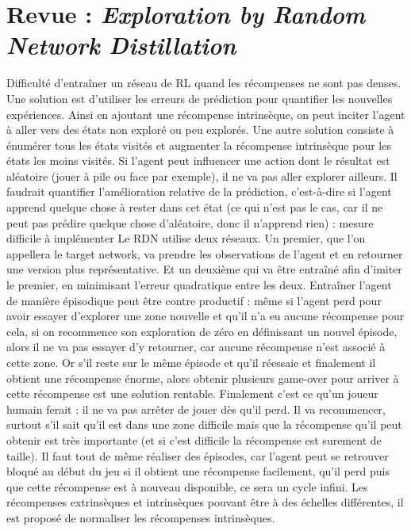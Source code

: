 \documentclass[a4paper,12pt]{report}
\begin{document}
\newpage \section{Revue : \textit{Exploration by Random Network Distillation} \cite{distillation}}
\label{revue_distillation}
Difficulté d'entraîner un réseau de RL quand les récompenses ne sont pas denses.
\newline
\newline Une solution est d’utiliser les erreurs de prédiction pour quantifier les nouvelles expériences. Ainsi en ajoutant une récompense intrinsèque, on peut inciter l’agent à aller vers des états non exploré ou peu explorés. Une autre solution consiste à énumérer tous les états visités et augmenter la récompense intrinsèque pour les états les moins visités.
\newline
\newline Si l’agent peut influencer une action dont le résultat est aléatoire (jouer à pile ou face par exemple), il ne va pas aller explorer ailleurs. Il faudrait quantifier l’amélioration relative de la prédiction, c’est-à-dire si l’agent apprend quelque chose à rester dans cet état (ce qui n’est pas le cas, car il ne peut pas prédire quelque chose d’aléatoire, donc il n’apprend rien) : mesure difficile à implémenter
\newline
\newline Le RDN utilise deux réseaux. Un premier, que l’on appellera le target network, va prendre les observations de l’agent et en retourner une version plus représentative. Et un deuxième qui va être entraîné afin d’imiter le premier, en minimisant l’erreur quadratique entre les deux.
\newline
\newline Entraîner l’agent de manière épisodique peut être contre productif :    même si l’agent perd pour avoir essayer d’explorer une zone nouvelle et qu’il n’a eu aucune récompense pour cela, si on recommence son exploration de zéro en définissant un nouvel épisode, alors il ne va pas essayer d’y retourner, car aucune récompense n’est associé à cette zone. Or s’il reste sur le même épisode et qu’il réessaie et finalement il obtient une récompense énorme, alors obtenir plusieurs game-over pour arriver à cette récompense est une solution rentable. Finalement c’est ce qu’un joueur humain ferait : il ne va pas arrêter de jouer dès qu’il perd. Il va recommencer, surtout s’il sait qu’il est dans une zone difficile mais que la récompense qu’il peut obtenir est très importante (et si c’est difficile la récompense est surement de taille). Il faut tout de même réaliser des épisodes, car l’agent peut se retrouver bloqué au début du jeu si il obtient une récompense facilement, qu’il perd puis que cette récompense est à nouveau disponible, ce sera un cycle infini.
\newline
\newline Les récompenses extrinsèques et intrinsèques pouvant être à des échelles différentes, il est proposé de normaliser les récompenses intrinsèques.
\end{document}
